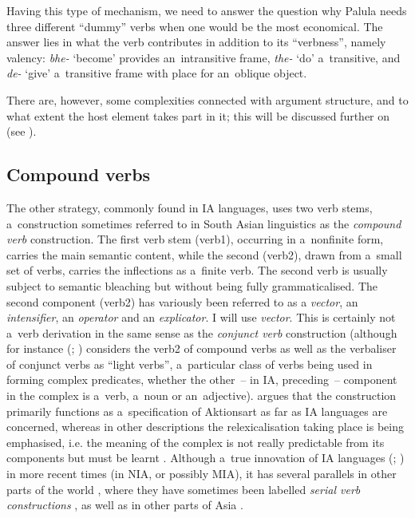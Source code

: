 Having this type of mechanism, we need to answer the question why Palula needs three different ``dummy'' verbs when one would be the most economical. The answer lies in what the verb contributes in addition to its ``verbness'', namely valency: \textit{bhe-} `become' provides an~intransitive frame, \textit{the-} `do' a~transitive, and \textit{de-} `give' a~transitive frame with place for an~oblique object. 


There are, however, some complexities connected with argument structure, and to what extent the host element takes part in it; this will be discussed further on (see ).


\subsection{Compound verbs}
\label{subsec:8-6-2}

The other strategy, commonly found in IA languages, uses two verb stems, a~construction sometimes referred to in South Asian linguistics \citep[326]{masica1991} as the \textit{compound verb} construction. The first verb stem (verb\textsc{1}), occurring in a~nonfinite form, carries the main semantic content, while the second (verb\textsc{2}), drawn from a~small set of verbs, carries the inflections as a~finite verb. The second verb is usually subject to semantic bleaching but without being fully grammaticalised. The second component (verb2) has variously been referred to as a \textit{vector}, an \textit{intensifier}, an \textit{operator} and an \textit{explicator}. I will use \textit{vector}. This is certainly not a~verb derivation in the same sense as the \textit{conjunct verb} construction (although for instance \citeauthor{butt1993} (\citeyear[31]{butt1993}; \citeyear[49]{butt2010}) considers the verb2 of compound verbs as well as the verbaliser of conjunct verbs as ``light verbs'', a~particular class of verbs being used in forming complex predicates, whether the other~-- in IA, preceding~-- component in the complex is a~verb, a~noun or an~adjective). \citet[326--330]{masica1991} argues that the construction primarily functions as a~specification of Aktionsart as far as IA languages are concerned, whereas in other descriptions the relexicalisation taking place is being emphasised, i.e. the meaning of the complex is not really predictable from its components but must be learnt \citep[143]{schmidt1999}. Although a~true innovation of IA languages (\citealt[326]{masica1991}; \citealt{hook1977}) in more recent times (in NIA, or possibly MIA), it has several parallels in other parts of the world \citep[348--349]{hook1977}, where they have sometimes been labelled \textit{serial verb constructions} \citep{ansaldo2006}, as well as in other parts of Asia \citep[559]{ebert2006}. 



